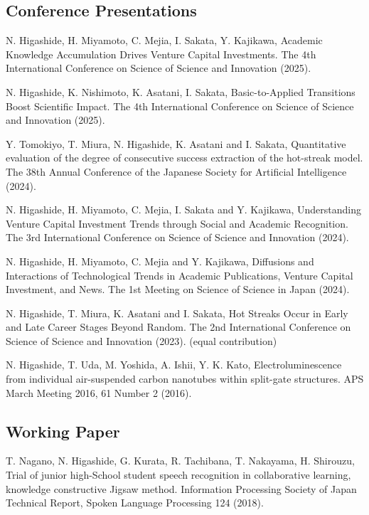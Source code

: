 \documentclass[10pt,a4paper]{article}
\newcommand{\pubitem}[1]{%
  \item #1
}
\begin{document}
\subsection{Conference Presentations}
\begin{publist}[resume]
\pubitem{N. Higashide, H. Miyamoto, C. Mejia, I. Sakata, Y. Kajikawa, Academic Knowledge Accumulation Drives Venture Capital Investments. The 4th International Conference on Science of Science and Innovation (2025).}
\pubitem{N. Higashide, K. Nishimoto, K. Asatani, I. Sakata, Basic-to-Applied Transitions Boost Scientific Impact. The 4th International Conference on Science of Science and Innovation (2025).}
\pubitem{Y. Tomokiyo, T. Miura, N. Higashide, K. Asatani and I. Sakata, Quantitative evaluation of the degree of consecutive success extraction of the hot-streak model. The 38th Annual Conference of the Japanese Society for Artificial Intelligence (2024).}
\pubitem{N. Higashide, H. Miyamoto, C. Mejia, I. Sakata and Y. Kajikawa, Understanding Venture Capital Investment Trends through Social and Academic Recognition. The 3rd International Conference on Science of Science and Innovation (2024).}
\pubitem{N. Higashide, H. Miyamoto, C. Mejia and Y. Kajikawa, Diffusions and Interactions of Technological Trends in Academic Publications, Venture Capital Investment, and News. The 1st Meeting on Science of Science in Japan (2024).}
\pubitem{N. Higashide\textdagger, T. Miura\textdagger, K. Asatani and I. Sakata, Hot Streaks Occur in Early and Late Career Stages Beyond Random. The 2nd International Conference on Science of Science and Innovation (2023). (\textdagger equal contribution)}
\pubitem{N. Higashide, T. Uda, M. Yoshida, A. Ishii, Y. K. Kato, Electroluminescence from individual air-suspended carbon nanotubes within split-gate structures. APS March Meeting 2016, 61 Number 2 (2016).}
\end{publist}

\subsection{Working Paper}
\begin{publist}[resume]
\pubitem{T. Nagano, N. Higashide, G. Kurata, R. Tachibana, T. Nakayama, H. Shirouzu, Trial of junior high-School student speech recognition in collaborative learning, knowledge constructive Jigsaw method. Information Processing Society of Japan Technical Report, Spoken Language Processing 124 (2018).}
\end{publist}
\end{document}

